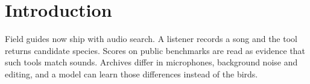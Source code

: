 \begin{abstract}
Song libraries are searched by people who need to name a bird from a field recording. We built a small benchmark of forty recordings and tested three audio models against a baseline that sees only the archive label. One model beat that baseline, and only on a minority of queries.
\end{abstract}
\section{Introduction}
Field guides now ship with audio search. A listener records a song and the tool returns candidate species. Scores on public benchmarks are read as evidence that such tools match sounds. Archives differ in microphones, background noise and editing, and a model can learn those differences instead of the birds.
